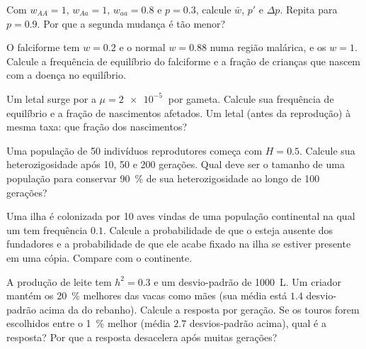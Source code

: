 \begin{exercise}[$\star\star$]\label{exo:b2:population-genetics:6}
Com $w_{AA} = 1$, $w_{Aa} = 1$, $w_{aa} = 0.8$ e $p = 0.3$, calcule
$\bar w$, $p'$ e $\Delta p$. Repita para $p = 0.9$. Por que a
segunda mudança é tão menor?
\end{exercise}

\begin{exercise}[$\star\star$]\label{exo:b2:population-genetics:7}
O  falciforme tem $w = 0.2$ e o  normal
$w = 0.88$ numa região malárica, e os  $w = 1$. Calcule a
frequência de equilíbrio do  falciforme e a fração de crianças que
nascem com a doença no equilíbrio.
\end{exercise}

\begin{exercise}[$\star\star$]\label{exo:b2:population-genetics:8}
Um letal  surge por  a $\mu = \qty{2e-5}{}$ por
gameta. Calcule sua frequência de equilíbrio e a fração de nascimentos
afetados. Um letal  (antes da reprodução) à mesma taxa: que
fração dos nascimentos?
\end{exercise}

\begin{exercise}[$\star\star$]\label{exo:b2:population-genetics:9}
Uma população de 50 indivíduos reprodutores começa com $H = 0.5$.
Calcule sua heterozigosidade após 10, 50 e 200 gerações. Qual deve ser
o tamanho de uma população para conservar \qty{90}{\%} de sua
heterozigosidade ao longo de 100 gerações?
\end{exercise}

\begin{exercise}[$\star\star\star$]\label{exo:b2:population-genetics:10}
Uma ilha é colonizada por 10 aves vindas de uma população continental
na qual um  tem frequência $0.1$. Calcule a probabilidade de que o
 esteja ausente dos fundadores e a probabilidade de que ele acabe
fixado na ilha se estiver presente em uma cópia. Compare com o
continente.
\end{exercise}

\begin{exercise}[$\star\star\star$]\label{exo:b2:population-genetics:11}
A produção de leite tem $h^{2} = 0.3$ e um desvio-padrão de
\qty{1000}{L}. Um criador mantém os \qty{20}{\%} melhores das vacas como
mães (sua média está $1.4$ desvio-padrão acima da do rebanho).
Calcule a resposta por geração. Se os touros forem escolhidos entre o
\qty{1}{\%} melhor (média $2.7$ desvios-padrão acima), qual é a
resposta? Por que a resposta desacelera após muitas gerações?
\end{exercise}

